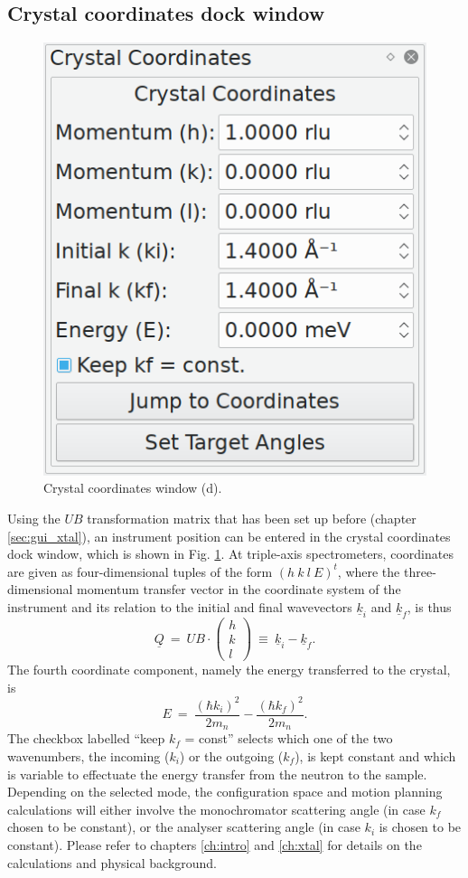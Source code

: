 \subsection{Crystal coordinates dock window}
\label{sec:gui_xtalcoords}
\begin{minipage}{1 \textwidth}
\setlength{\intextsep}{0.25cm}
\begin{figure}
	\vspace{-0.25cm}
	\includegraphics[width = 0.25 \textwidth]{figures/gui_xtalcoords}
	\caption[Crystal coordinates window.]{Crystal coordinates window (d).
		\label{fig:gui_xtalcoords}}
\end{figure}

Using the $UB$ transformation matrix that has been set up before (chapter \ref{sec:gui_xtal}),
an instrument position can be entered in the crystal coordinates dock window, which is
shown in Fig. \ref{fig:gui_xtalcoords}.
At triple-axis spectrometers, coordinates are given as four-dimensional tuples of the
form $\left(h\  k\  l\  E \right)^t$, where the three-dimensional momentum transfer
vector in the coordinate system of the instrument and its relation to the initial and final
wavevectors $\underline{k}_i$ and $\underline{k}_f$, is thus \cite[p. 11]{Shirane2002} \cite{Lumsden2005}
\begin{equation}
	\underline{Q}\ =\ UB\cdot \left(\begin{array}{c} h \\ k \\ l \end{array}\right) \ \equiv\ \underline{k}_i - \underline{k}_f.
\end{equation}
The fourth coordinate component, namely the energy transferred to the crystal, is \cite[p. 11]{Shirane2002}
\begin{equation}
	E \ =\ \frac{\left( \hbar k_i \right)^2}{2 m_n} - \frac{\left( \hbar k_f \right)^2}{2 m_n}.
\end{equation}
The checkbox labelled ``keep $k_f$ = const'' selects which one of the two wavenumbers, the incoming ($k_i$) 
or the outgoing ($k_f$), is kept constant and which is variable to effectuate the energy transfer
from the neutron to the sample.
Depending on the selected mode, the configuration space and motion planning calculations will either involve
the monochromator scattering angle (in case $k_f$ chosen to be constant), or the analyser scattering
angle (in case $k_i$ is chosen to be constant).
Please refer to chapters \ref{ch:intro} and \ref{ch:xtal} for details on the calculations and physical background.


\end{minipage}
